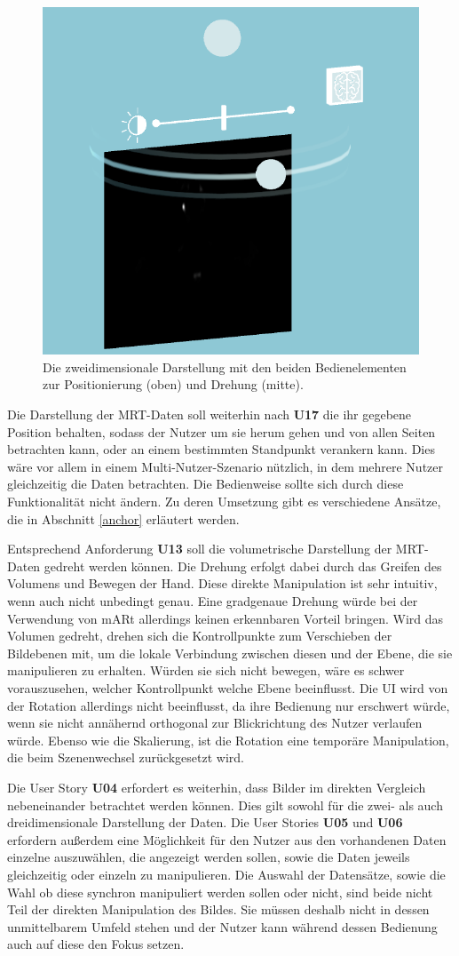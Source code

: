 \begin{figure}[!htb]
	\centering
	\includegraphics[width=0.5\linewidth]{images/mARt_turn.png}
	\caption{Die zweidimensionale Darstellung mit den beiden Bedienelementen zur Positionierung (oben) und Drehung (mitte).}
	\label{img:3dPos}
\end{figure}
\FloatBarrier

Die Darstellung der MRT-Daten soll weiterhin nach \textbf{U17} die ihr gegebene Position behalten, sodass der Nutzer um sie herum gehen und von allen Seiten betrachten kann, oder an einem bestimmten Standpunkt verankern kann. Dies wäre vor allem in einem Multi-Nutzer-Szenario nützlich, in dem mehrere Nutzer gleichzeitig die Daten betrachten.
Die Bedienweise sollte sich durch diese Funktionalität nicht ändern. Zu deren Umsetzung gibt es verschiedene Ansätze, die in Abschnitt \ref{anchor} erläutert werden.

Entsprechend Anforderung \textbf{U13} soll die volumetrische Darstellung der MRT-Daten gedreht werden können. 
Die Drehung erfolgt dabei durch das Greifen des Volumens und Bewegen der Hand. Diese direkte Manipulation ist sehr intuitiv, wenn auch nicht unbedingt genau. Eine gradgenaue Drehung würde bei der Verwendung von mARt allerdings keinen erkennbaren Vorteil bringen. 
Wird das Volumen gedreht, drehen sich die Kontrollpunkte zum Verschieben der Bildebenen mit, um die lokale Verbindung zwischen diesen und der Ebene, die sie manipulieren zu erhalten. Würden sie sich nicht bewegen, wäre es schwer vorauszusehen, welcher Kontrollpunkt welche Ebene beeinflusst. 
Die UI wird von der Rotation allerdings nicht beeinflusst, da ihre Bedienung nur erschwert würde, wenn sie nicht annähernd orthogonal zur Blickrichtung des Nutzer verlaufen würde. 
Ebenso wie die Skalierung, ist die Rotation eine temporäre Manipulation, die beim Szenenwechsel zurückgesetzt wird.

Die User Story \textbf{U04} erfordert es weiterhin, dass Bilder im direkten Vergleich nebeneinander betrachtet werden können. Dies gilt sowohl für die zwei- als auch dreidimensionale Darstellung der Daten. Die User Stories \textbf{U05} und \textbf{U06} erfordern außerdem eine Möglichkeit für den Nutzer aus den vorhandenen Daten einzelne auszuwählen, die angezeigt werden sollen, sowie die Daten jeweils gleichzeitig oder einzeln zu manipulieren. 
Die Auswahl der Datensätze, sowie die Wahl ob diese synchron manipuliert werden sollen oder nicht, sind beide nicht Teil der direkten Manipulation des Bildes. Sie müssen deshalb nicht in dessen unmittelbarem Umfeld stehen und der Nutzer kann während dessen Bedienung auch auf diese den Fokus setzen.
 
